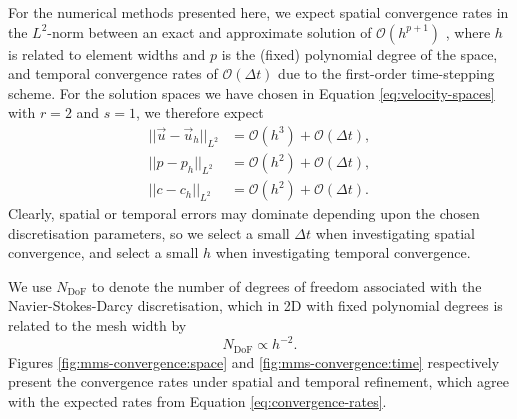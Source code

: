         For the numerical methods presented here, we expect spatial convergence rates in the $L^2$-norm between an exact and approximate solution of $\mathcal{O}(h^{p+1})$ \cite{cangianiHpVersionDiscontinuousGalerkin2017}, where $h$ is related to element widths and $p$ is the (fixed) polynomial degree of the space, and temporal convergence rates of $\mathcal{O}(\Delta t)$ due to the first-order time-stepping scheme. For the solution spaces we have chosen in Equation \eqref{eq:velocity-spaces} with $r = 2$ and $s = 1$, we therefore expect
        \begin{subequations}
            \begin{align}
                ||\vec{u} - \vec{u}_h||_{L^2} & = \mathcal{O}(h^3) + \mathcal{O}(\Delta t), \label{eq:convergence-rates:u}\\
                ||p - p_h||_{L^2} & = \mathcal{O}(h^2) + \mathcal{O}(\Delta t), \label{eq:convergence-rates:p}\\
                ||c - c_h||_{L^2} & = \mathcal{O}(h^2) + \mathcal{O}(\Delta t). \label{eq:convergence-rates:c}
            \end{align}
            \label{eq:convergence-rates}
        \end{subequations}
        Clearly, spatial or temporal errors may dominate depending upon the chosen discretisation parameters, so we select a small $\Delta t$ when investigating spatial convergence, and select a small $h$ when investigating temporal convergence.

        We use $N_\text{DoF}$ to denote the number of degrees of freedom associated with the Navier-Stokes-Darcy discretisation, which in 2D with fixed polynomial degrees is related to the mesh width by 
        \begin{equation*}
            N_\text{DoF} \propto h^{-2}.
        \end{equation*}
        Figures \ref{fig:mms-convergence:space} and \ref{fig:mms-convergence:time} respectively present the convergence rates under spatial and temporal refinement, which agree with the expected rates from Equation \eqref{eq:convergence-rates}.

